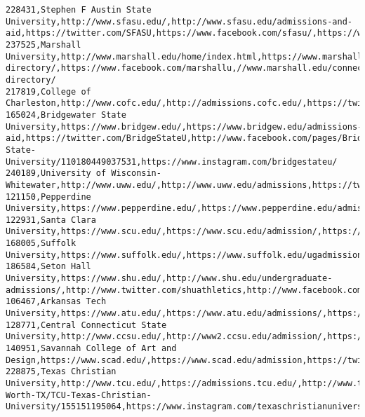 \documentclass[11pt]{article}
\begin{document}
\begin{Verbatim}[commandchars=\\\{\}]
228431,Stephen F Austin State University,http://www.sfasu.edu/,http://www.sfasu.edu/admissions-and-aid,https://twitter.com/SFASU,https://www.facebook.com/sfasu/,https://www.instagram.com/sfa\_jacks/
237525,Marshall University,http://www.marshall.edu/home/index.html,https://www.marshall.edu/admissions/,//www.marshall.edu/connected/twitter-directory/,https://www.facebook.com/marshallu,//www.marshall.edu/connected/instagram-directory/
217819,College of Charleston,http://www.cofc.edu/,http://admissions.cofc.edu/,https://twitter.com/CofC,https://www.facebook.com/collegeofcharleston,https://www.instagram.com/collegeofcharleston/
165024,Bridgewater State University,https://www.bridgew.edu/,https://www.bridgew.edu/admissions-aid,https://twitter.com/BridgeStateU,http://www.facebook.com/pages/Bridgewater-State-University/110180449037531,https://www.instagram.com/bridgestateu/
240189,University of Wisconsin-Whitewater,http://www.uww.edu/,http://www.uww.edu/admissions,https://twitter.com/uwwhitewater,https://www.facebook.com/uwwhitewater,https://www.instagram.com/uwwhitewater/
121150,Pepperdine University,https://www.pepperdine.edu/,https://www.pepperdine.edu/admission/,https://www.twitter.com/pepperdine,https://www.facebook.com/pepperdine,http://instagram.com/pepperdine
122931,Santa Clara University,https://www.scu.edu/,https://www.scu.edu/admission/,https://twitter.com/SantaClaraUniv,https://www.facebook.com/SantaClaraUniversity,https://instagram.com/santaclarauniversity/
168005,Suffolk University,https://www.suffolk.edu/,https://www.suffolk.edu/ugadmission/index.php,https://twitter.com/Suffolk\_U,https://www.facebook.com/suffolkuniversity,http://instagram.com/suffolk\_U/
186584,Seton Hall University,https://www.shu.edu/,http://www.shu.edu/undergraduate-admissions/,http://www.twitter.com/shuathletics,http://www.facebook.com/shuathletics,http://www.instagram.com/shuathletics
106467,Arkansas Tech University,https://www.atu.edu/,https://www.atu.edu/admissions/,https://twitter.com/arkansastech,https://www.facebook.com/arkansastech,https://instagram.com/arkansastech
128771,Central Connecticut State University,http://www.ccsu.edu/,http://www2.ccsu.edu/admission/,https://twitter.com/CCSU,https://www.facebook.com/CentralConnecticutStateUniversity,https://instagram.com/ccsu\_official/
140951,Savannah College of Art and Design,https://www.scad.edu/,https://www.scad.edu/admission,https://twitter.com/SCADdotedu,https://www.facebook.com/scad.edu,https://www.instagram.com/scaddotedu/
228875,Texas Christian University,http://www.tcu.edu/,https://admissions.tcu.edu/,http://www.twitter.com/tcu,http://www.facebook.com/pages/Fort-Worth-TX/TCU-Texas-Christian-University/155151195064,https://www.instagram.com/texaschristianuniversity/

\end{Verbatim}
\end{document}
